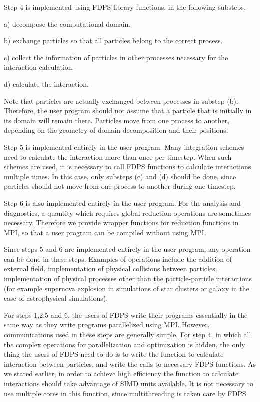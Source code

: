 \documentclass[dvipdfmx]{acm_proc_article-sp}
\begin{document}
Step 4 is implemented using FDPS library functions, in the following
substeps.

\begin{description}

  \item{a)} decompose the computational domain.
  \item{b)} exchange particles so that all particles belong to
    the correct process.
   \item{c)} collect the information of particles
     in other processes necessary for the interaction calculation.
   \item{d)} calculate the interaction.

\end{description}
Note that particles are actually exchanged between processes in
substep (b). Therefore, the user program should not assume that a
particle that is  initially in its domain will remain there. Particles 
move from one process to another, depending on the geometry of domain
decomposition and their positions. 

Step 5 is implemented entirely in the user program.  Many integration
schemes need to calculate the interaction more than once per
timestep. When such schemes are used, it is necessary to call FDPS
functions to calculate interactions multiple times. In this case, only
substeps (c) and (d) should be done, since particles should not move
from one process to another during one timestep.

Step 6 is also implemented entirely in the user program.
For the analysis and diagnostics,  a quantity which requires global
reduction operations are sometimes necessary. Therefore we provide
wrapper functions for reduction functions in MPI, so that a user
program  can be compiled without using MPI. 

Since steps 5 and 6 are implemented entirely in the user program, any
operation can be done in these steps. Examples of operations include
the addition of external field, implementation of physical collisions
between particles, implementation of physical processes other than the
particle-particle interactions (for example supernova explosion in
simulations of star clusters or galaxy in the case of astrophysical
simulations).

For steps 1,2,5 and 6, the users of FDPS write their programs
essentially in the same way  as  they write programs
parallelized using MPI. However, communications used in these steps
are generally simple.  For step 4, in which all the complex operations
for parallelization and optimization is hidden, the only thing the
users of FDPS need to do is to write the function to calculate
interaction between particles, and write the calls to necessary FDPS
functions.  As we stated earlier, in order to achieve high efficiency
the function to calculate interactions should take advantage of SIMD
units available. It is not necessary to use multiple cores in this
function, since multithreading is taken care by FDPS.
\end{document}
